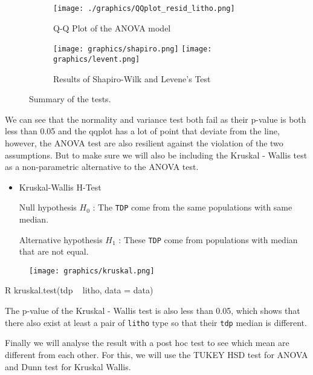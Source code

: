 \begin{figure}[H]
    \centering
    \begin{subfigure}[b]{0.35\textwidth}
        \centering
        \texttt{[image: ./graphics/QQplot\_resid\_litho.png]}
        \caption{Q-Q Plot of the ANOVA model}
        \label{fig:anova_litho_shapiro_wilk}
    \end{subfigure}
    \begin{subfigure}[b]{0.6\textwidth}
        \centering
        \texttt{[image: graphics/shapiro.png]}
        \texttt{[image: graphics/levent.png]}
        \caption{Results of Shapiro-Wilk and Levene's Test}
        \label{fig:anova_litho_shapiro_wilk}
    \end{subfigure}
    \caption{Summary of the tests.}
\end{figure}

We can see that the normality and variance test both fail as their p-value is both less than 0.05 and the qqplot has a lot of point that deviate from the line, however, the ANOVA test are also resilient against the violation of the two assumptions\cite{tukey}. But to make sure we will also be including the Kruskal - Wallis test as a non-parametric alternative to the ANOVA test.
\begin{itemize}
    \item Kruskal-Wallis H-Test
    
    \qquad Null hypothesis $H_0$ : The \verb|TDP| come from the same populations with same median.

    \qquad Alternative hypothesis $H_1$ : These \verb|TDP| come from populations with median that are not equal.
\end{itemize}

\begin{figure}[htbp]
    \centering
    \texttt{[image: graphics/kruskal.png]}
\end{figure}

\begin{code}{R}
    kruskal.test(tdp ~ litho, data = data)
\end{code}
The p-value of the Kruskal - Wallis test is also less than 0.05, which shows that there also exist at least a pair of \verb|litho| type so that their \verb|tdp| median is different.

Finally we will analyse the result with a post hoc test to see which mean are different from each other. For this, we will use the TUKEY HSD test for ANOVA and Dunn test for Kruskal Wallis.

